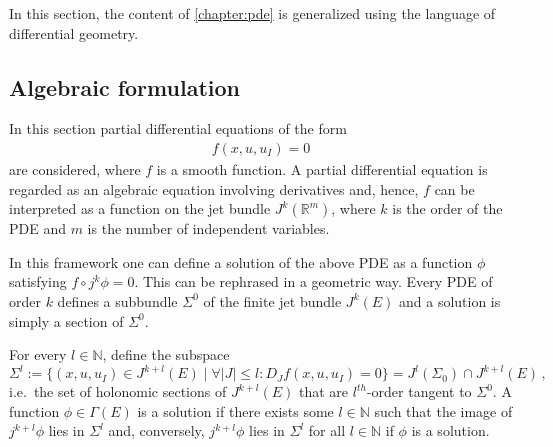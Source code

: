     In this section, the content of \cref{chapter:pde} is generalized using the language of differential geometry.

\subsection{Algebraic formulation}

    In this section partial differential equations of the form
    \begin{gather}
        \label{var:pde_jet}
        f(x,u,u_I) = 0
    \end{gather}
    are considered, where $f$ is a smooth function. A partial differential equation is regarded as an algebraic equation involving derivatives and, hence, $f$ can be interpreted as a function on the jet bundle $J^k(\mathbb{R}^m)$, where $k$ is the order of the PDE and $m$ is the number of independent variables.

    In this framework one can define a solution of the above PDE as a function $\phi$ satisfying $f\circ j^k\phi=0$. This can be rephrased in a geometric way. Every PDE of order $k$ defines a subbundle $\Sigma^0$ of the finite jet bundle $J^k(E)$ and a solution is simply a section of $\Sigma^0$.

    \begin{remark}
        For every $l\in\mathbb{N}$, define the subspace \[\Sigma^l:=\{(x,u,u_I)\in J^{k+l}(E)\mid\forall|J|\leq l:D_Jf(x,u,u_I)= 0\} = J^l(\Sigma_0)\cap J^{k+l}(E)\,,\] i.e.~the set of holonomic sections of $J^{k+l}(E)$ that are $l^{th}$-order tangent to $\Sigma^0$. A function $\phi\in\Gamma(E)$ is a solution if there exists some $l\in\mathbb{N}$ such that the image of $j^{k+l}\phi$ lies in $\Sigma^l$ and, conversely, $j^{k+l}\phi$ lies in $\Sigma^l$ for all $l\in\mathbb{N}$ if $\phi$ is a solution.
    \end{remark}


